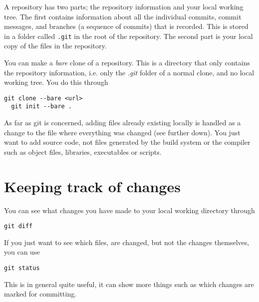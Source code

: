 A repository has two parts; the repository information and your local working
tree. The first contains information about all the individual commits, commit
messages, and branches (a sequence of commits) that is recorded. This is stored
in a folder called \texttt{.git} in the root of the repository. The second part
is your local copy of the files in the repository.

You can make a \emph{bare} clone of a repository. This is a directory that only
contains the repository information, i.e. only the \emph{.git} folder of a
normal clone, and no local working tree. You do this through
\begin{lstlisting}[style=shell]
  git clone --bare <url>
  git init --bare .
\end{lstlisting}

As far as git is concerned, adding files already existing locally is handled as
a change to the file where everything was changed (see further down). You just
want to add source code, not files generated by the build system or the compiler
such as object files, libraries, executables or scripts.

\section{Keeping track of changes}

You can see what changes you have made to your local working directory through
\begin{lstlisting}[style=shell]
  git diff
\end{lstlisting}
If you just want to see which files, are changed, but not the changes
themselves, you can use
\begin{lstlisting}[style=shell]
  git status
\end{lstlisting}
This is in general quite useful, it can show more things such as which changes
are marked for committing.

